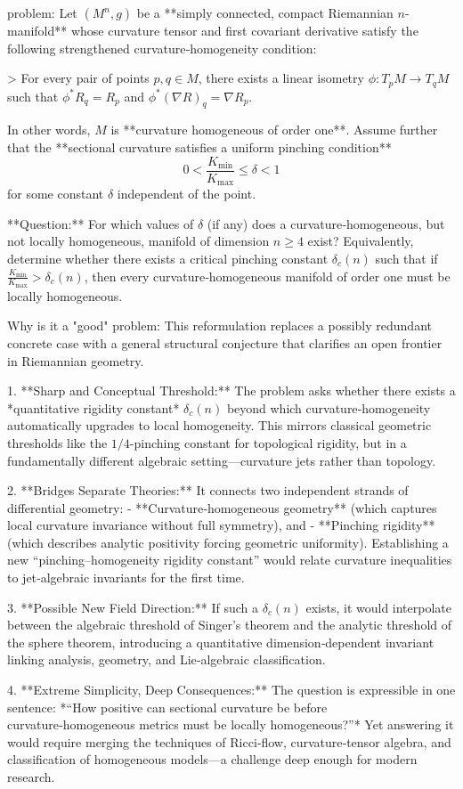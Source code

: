 problem:  
Let \( (M^n, g) \) be a **simply connected, compact Riemannian \(n\)-manifold** whose curvature tensor and first covariant derivative satisfy the following strengthened curvature‑homogeneity condition:

> For every pair of points \(p,q\in M\), there exists a linear isometry \(\phi:T_pM\to T_qM\) such that \(\phi^*R_q = R_p\) and \(\phi^*(\nabla R)_q = \nabla R_p\).

In other words, \(M\) is **curvature homogeneous of order one**.  
Assume further that the **sectional curvature satisfies a uniform pinching condition**
\[
0 < \frac{K_{\min}}{K_{\max}} \le \delta < 1
\]
for some constant \(\delta\) independent of the point.

**Question:**  
For which values of \(\delta\) (if any) does a curvature‑homogeneous, but not locally homogeneous, manifold of dimension \(n\ge4\) exist?  
Equivalently, determine whether there exists a critical pinching constant \(\delta_c(n)\) such that if \(\frac{K_{\min}}{K_{\max}} > \delta_c(n)\), then every curvature‑homogeneous manifold of order one must be locally homogeneous.

Why is it a "good" problem:  
This reformulation replaces a possibly redundant concrete case with a general structural conjecture that clarifies an open frontier in Riemannian geometry.  

1. **Sharp and Conceptual Threshold:**  
   The problem asks whether there exists a *quantitative rigidity constant* \(\delta_c(n)\) beyond which curvature‑homogeneity automatically upgrades to local homogeneity. This mirrors classical geometric thresholds like the \(1/4\)-pinching constant for topological rigidity, but in a fundamentally different algebraic setting—curvature jets rather than topology.  

2. **Bridges Separate Theories:**  
   It connects two independent strands of differential geometry:  
   - **Curvature‑homogeneous geometry** (which captures local curvature invariance without full symmetry), and  
   - **Pinching rigidity** (which describes analytic positivity forcing geometric uniformity).  
   Establishing a new “pinching–homogeneity rigidity constant” would relate curvature inequalities to jet‑algebraic invariants for the first time.  

3. **Possible New Field Direction:**  
   If such a \(\delta_c(n)\) exists, it would interpolate between the algebraic threshold of Singer’s theorem and the analytic threshold of the sphere theorem, introducing a quantitative dimension‑dependent invariant linking analysis, geometry, and Lie‑algebraic classification.  

4. **Extreme Simplicity, Deep Consequences:**  
   The question is expressible in one sentence:  
   *“How positive can sectional curvature be before curvature‑homogeneous metrics must be locally homogeneous?”*  
   Yet answering it would require merging the techniques of Ricci‑flow, curvature‑tensor algebra, and classification of homogeneous models—a challenge deep enough for modern research.